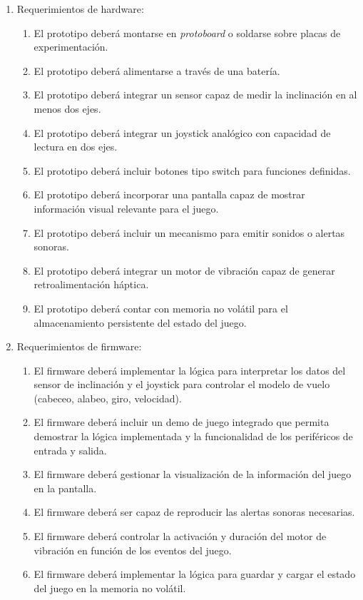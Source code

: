 \documentclass[
11pt, %
]{charter}
\begin{document}
\begin{enumerate}
	\item Requerimientos de hardware:
	\begin{enumerate}
		\item El prototipo deberá montarse en \textit{protoboard} o soldarse sobre placas de experimentación.
		\item El prototipo deberá alimentarse a través de una batería.
		\item El prototipo deberá integrar un sensor capaz de medir la inclinación en al menos dos ejes.
		\item El prototipo deberá integrar un joystick analógico con capacidad de lectura en dos ejes.
		\item El prototipo deberá incluir botones tipo switch para funciones definidas.
		\item El prototipo deberá incorporar una pantalla capaz de mostrar información visual relevante para el juego.
		\item El prototipo deberá incluir un mecanismo para emitir sonidos o alertas sonoras.
		\item El prototipo deberá integrar un motor de vibración capaz de generar retroalimentación háptica.
		\item El prototipo deberá contar con memoria no volátil para el almacenamiento persistente del estado del juego.
	\end{enumerate}
	\item Requerimientos de firmware:
	\begin{enumerate}
		\item El firmware deberá implementar la lógica para interpretar los datos del sensor de inclinación y el joystick para controlar el modelo de vuelo (cabeceo, alabeo, giro, velocidad).
		\item El firmware deberá incluir un demo de juego integrado que permita demostrar la lógica implementada y la funcionalidad de los periféricos de entrada y salida.
		\item El firmware deberá gestionar la visualización de la información del juego en la pantalla.
		\item El firmware deberá ser capaz de reproducir las alertas sonoras necesarias.
		\item El firmware deberá controlar la activación y duración del motor de vibración en función de los eventos del juego.
		\item El firmware deberá implementar la lógica para guardar y cargar el estado del juego en la memoria no volátil.

\end{enumerate}
\end{enumerate}
\end{document}
